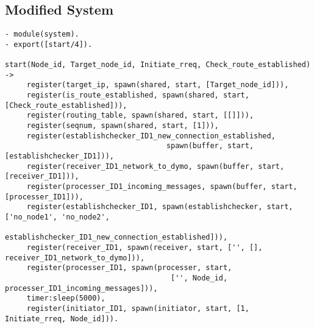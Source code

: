 \subsection*{Modified System}
\footnotesize
\begin{verbatim}
- module(system).
- export([start/4]).

start(Node_id, Target_node_id, Initiate_rreq, Check_route_established) -> 
     register(target_ip, spawn(shared, start, [Target_node_id])),
     register(is_route_established, spawn(shared, start, [Check_route_established])),
     register(routing_table, spawn(shared, start, [[]])),
     register(seqnum, spawn(shared, start, [1])),     
     register(establishchecker_ID1_new_connection_established, 
                                     spawn(buffer, start, [establishchecker_ID1])),
     register(receiver_ID1_network_to_dymo, spawn(buffer, start, [receiver_ID1])),
     register(processer_ID1_incoming_messages, spawn(buffer, start, [processer_ID1])),     
     register(establishchecker_ID1, spawn(establishchecker, start, ['no_node1', 'no_node2',
                                     establishchecker_ID1_new_connection_established])),
     register(receiver_ID1, spawn(receiver, start, ['', [], receiver_ID1_network_to_dymo])),
     register(processer_ID1, spawn(processer, start, 
                                      ['', Node_id, processer_ID1_incoming_messages])),     
     timer:sleep(5000),
     register(initiator_ID1, spawn(initiator, start, [1, Initiate_rreq, Node_id])).
\end{verbatim}
\normalsize